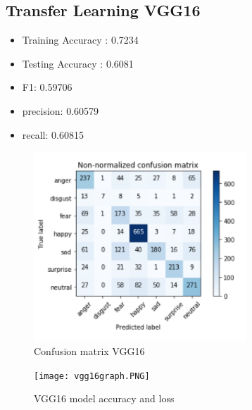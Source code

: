 \subsection{Transfer Learning VGG16}
\begin{itemize}
  \item Training Accuracy : 0.7234
  \item Testing Accuracy  : 0.6081
  \item F1: 0.59706
  \item precision: 0.60579
 \item  recall: 0.60815
\end{itemize}
\begin{figure}[h]
\label{ss}
\centering
\includegraphics[width= 8cm]{confmatr_vgg16.PNG}
\caption{Confusion matrix VGG16}
\end{figure}
\begin{figure}[h]
\label{ss}
\centering
\texttt{[image: vgg16graph.PNG]}
\caption{VGG16 model accuracy and loss}
\end{figure}

